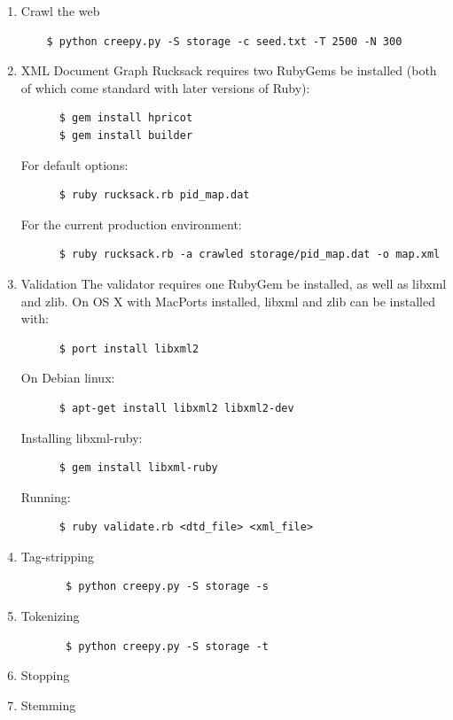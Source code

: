 \documentclass[letterpaper,11pt,twoside]{article}
\begin{document}
\begin{enumerate}
	\item Crawl the web	
	\begin{verbatim}
	$ python creepy.py -S storage -c seed.txt -T 2500 -N 300
	\end{verbatim}
	
	\item XML Document Graph
	Rucksack requires two RubyGems be installed (both of which come standard with later versions of Ruby):
	\begin{verbatim}
	  $ gem install hpricot
	  $ gem install builder
	\end{verbatim}
	For default options:
	\begin{verbatim}
	  $ ruby rucksack.rb pid_map.dat
	\end{verbatim}
	For the current production environment:
	\begin{verbatim}
	  $ ruby rucksack.rb -a crawled storage/pid_map.dat -o map.xml
	\end{verbatim}
	
	\item Validation
	The validator requires one RubyGem be installed, as well as libxml and zlib.
	On OS X with MacPorts installed, libxml and zlib can be installed with:
	\begin{verbatim}
	  $ port install libxml2
	\end{verbatim}
	On Debian linux:
	\begin{verbatim}
	  $ apt-get install libxml2 libxml2-dev
	\end{verbatim}
	Installing libxml-ruby:
	\begin{verbatim}
	  $ gem install libxml-ruby
	\end{verbatim}
	Running:
	\begin{verbatim}
	  $ ruby validate.rb <dtd_file> <xml_file>
	\end{verbatim}
	
	
	\item Tag-stripping
	\begin{verbatim} 
	   $ python creepy.py -S storage -s 
	\end{verbatim}
	
	\item Tokenizing
	\begin{verbatim} 
	   $ python creepy.py -S storage -t 
	\end{verbatim}
	
	\item Stopping
	
	\item Stemming
	
\end{enumerate}
\end{document}
